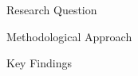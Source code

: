 \begin{frame}

    \begin{block}{Research Question}
    \end{block}
    
    \begin{block}{Methodological Approach} 
    \end{block}
    
    \begin{block}{Key Findings} 
    \end{block}
    
\end{frame}
